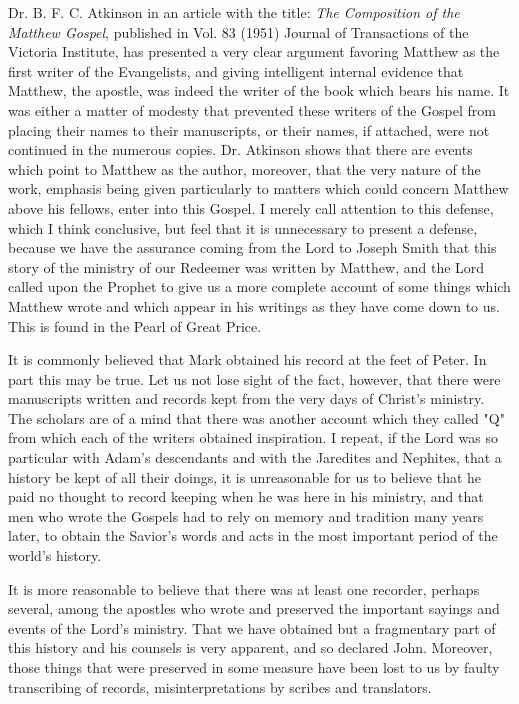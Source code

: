 Dr. B. F. C. Atkinson in an article with the title: \textit{The Composition of the Matthew Gospel},
published in Vol. 83 (1951) {Journal of Transactions of the Victoria Institute}, has presented a
very clear argument favoring Matthew as the first writer of the Evangelists, and giving
intelligent internal evidence that Matthew, the apostle, was indeed the writer of the book
which bears his name. It was either a matter of modesty that prevented these writers of the
Gospel from placing their names to their manuscripts, or their names, if attached, were not
continued in the numerous copies. Dr. Atkinson shows that there are events which point to
Matthew as the author, moreover, that the very nature of the work, emphasis being given
particularly to matters which could concern Matthew above his fellows, enter into this
Gospel. I merely call attention to this defense, which I think conclusive, but feel that it is
unnecessary to present a defense, because we have the assurance coming from the Lord to
Joseph Smith that this story of the ministry of our Redeemer was written by Matthew, and
the Lord called upon the Prophet to give us a more complete account of some things which
Matthew wrote and which appear in his writings as they have come down to us. This is found
in the Pearl of Great Price.

It is commonly believed that Mark obtained his record at the feet of Peter. In part this may be
true. Let us not lose sight of the fact, however, that there were manuscripts written and
records kept from the very days of Christ's ministry. The scholars are of a mind that there
was another account which they called "Q" from which each of the writers obtained
inspiration. I repeat, if the Lord was so particular with Adam's descendants and with the
Jaredites and Nephites, that a history be kept of all their doings, it is unreasonable for us to
believe that he paid no thought to record keeping when he was here in his ministry, and that
men who wrote the Gospels had to rely on memory and tradition many years later, to obtain
the Savior's words and acts in the most important period of the world's history.

It is more reasonable to believe that there was at least one recorder, perhaps several, among
the apostles who wrote and preserved the important sayings and events of the Lord's
ministry. That we have obtained but a fragmentary part of this history and his counsels is
very apparent, and so declared John. Moreover, those things that were preserved in some
measure have been lost to us by faulty transcribing of records, misinterpretations by scribes
and translators.

